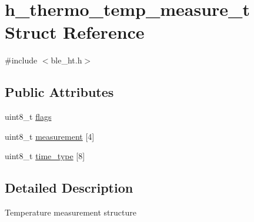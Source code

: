 \hypertarget{structh__thermo__temp__measure__t}{\section{h\-\_\-thermo\-\_\-temp\-\_\-measure\-\_\-t Struct Reference}
\label{structh__thermo__temp__measure__t}
}


{\ttfamily \#include $<$ble\-\_\-ht.\-h$>$}

\subsection*{Public Attributes}
\begin{DoxyCompactItemize}
\item 
uint8\-\_\-t \hyperlink{structh__thermo__temp__measure__t_afce338fd434c1af7a9d5ef07e4b6d3ad}{flags}
\item 
uint8\-\_\-t \hyperlink{structh__thermo__temp__measure__t_a5804c9b8d6bb0fefe6e7811a41445909}{measurement} \mbox{[}4\mbox{]}
\item 
uint8\-\_\-t \hyperlink{structh__thermo__temp__measure__t_ac2851384f5849c3f5e73d3397833b561}{time\-\_\-type} \mbox{[}8\mbox{]}
\end{DoxyCompactItemize}


\subsection{Detailed Description}
Temperature measurement structure 

